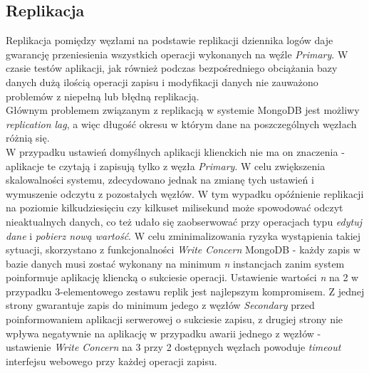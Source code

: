 \subsection{Replikacja}
Replikacja pomiędzy węzłami na podstawie replikacji dziennika logów daje gwarancję przeniesienia wszystkich operacji wykonanych na węźle \textit{Primary}. W czasie testów aplikacji, jak również podczas bezpośredniego obciążania bazy danych dużą ilością operacji zapisu i modyfikacji danych nie zauważono problemów z niepełną lub błędną replikacją. \\
Głównym problemem związanym z replikacją w systemie MongoDB jest możliwy \textit{replication lag}, a więc długość okresu w którym dane na poszczególnych węzłach różnią się. \\
W przypadku ustawień domyślnych aplikacji klienckich nie ma on znaczenia - aplikacje te czytają i zapisują tylko z węzła \textit{Primary}. W celu zwiększenia skalowalności systemu, zdecydowano jednak na zmianę tych ustawień i wymuszenie odczytu z pozostałych węzłów. W tym wypadku opóźnienie replikacji na poziomie kilkudziesięciu czy kilkuset milisekund może spowodować odczyt nieaktualnych danych, co też udało się zaobserwować przy operacjach typu \textit{edytuj dane} i \textit{pobierz nową wartość}. W celu zminimalizowania ryzyka wystąpienia takiej sytuacji, skorzystano z funkcjonalności \textit{Write Concern} MongoDB - każdy zapis w bazie danych musi zostać wykonany na minimum \textit{n} instancjach zanim system poinformuje aplikację kliencką o sukciesie operacji. Ustawienie wartości \textit{n} na 2 w przypadku 3-elementowego zestawu replik jest najlepszym kompromisem. Z jednej strony gwarantuje zapis do minimum jedego z węzłów \textit{Secondary} przed poinformowaniem aplikacji serwerowej o sukciesie zapisu, z drugiej strony nie wpływa negatywnie na aplikację w przypadku awarii jednego z węzłów - ustawienie \textit{Write Concern} na 3 przy 2 dostępnych węzłach powoduje \textit{timeout} interfejsu webowego przy każdej operacji zapisu.

